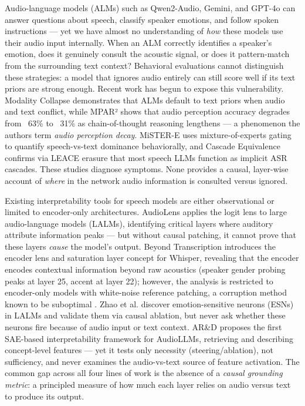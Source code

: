 \documentclass[a4paper]{article}
\begin{document}
Audio-language models (ALMs) such as Qwen2-Audio, Gemini, and GPT-4o can answer questions about speech, classify speaker emotions, and follow spoken instructions — yet we have almost no understanding of \textit{how} these models use their audio input internally. When an ALM correctly identifies a speaker's emotion, does it genuinely consult the acoustic signal, or does it pattern-match from the surrounding text context? Behavioral evaluations cannot distinguish these strategies: a model that ignores audio entirely can still score well if its text priors are strong enough. Recent work has begun to expose this vulnerability. Modality Collapse \cite{zhao2602} demonstrates that ALMs default to text priors when audio and text conflict, while MPAR² \cite{chen2603} shows that audio perception accuracy degrades from ~63\% to ~31\% as chain-of-thought reasoning lengthens — a phenomenon the authors term \textit{audio perception decay}. MiSTER-E \cite{iisc2602} uses mixture-of-experts gating to quantify speech-vs-text dominance behaviorally, and Cascade Equivalence \cite{arxiv_2602.17598} confirms via LEACE erasure that most speech LLMs function as implicit ASR cascades. These studies diagnose symptoms. None provides a causal, layer-wise account of \textit{where} in the network audio information is consulted versus ignored.

Existing interpretability tools for speech models are either observational or limited to encoder-only architectures. AudioLens \cite{ho2025} applies the logit lens to large audio-language models (LALMs), identifying critical layers where auditory attribute information peaks — but without causal patching, it cannot prove that these layers \textit{cause} the model's output. Beyond Transcription \cite{glazer2025} introduces the encoder lens and saturation layer concept for Whisper, revealing that the encoder encodes contextual information beyond raw acoustics (speaker gender probing peaks at layer 25, accent at layer 22); however, the analysis is restricted to encoder-only models with white-noise reference patching, a corruption method known to be suboptimal \cite{heimersheim2024}. Zhao et al. \cite{arxiv_2601.03115} discover emotion-sensitive neurons (ESNs) in LALMs and validate them via causal ablation, but never ask whether these neurons fire because of audio input or text context. AR\&D \cite{chowdhury2026} proposes the first SAE-based interpretability framework for AudioLLMs, retrieving and describing concept-level features — yet it tests only necessity (steering/ablation), not sufficiency, and never examines the audio-vs-text source of feature activation. The common gap across all four lines of work is the absence of a \textit{causal grounding metric}: a principled measure of how much each layer relies on audio versus text to produce its output.
\end{document}
